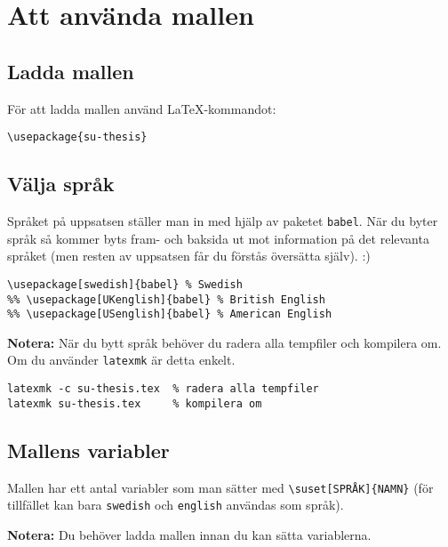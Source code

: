 
\section{Att använda mallen}
\label{mallen}


\subsection{Ladda mallen}
\label{ladda}

För att ladda mallen använd \LaTeX{}-kommandot:

\begin{verbatim}
\usepackage{su-thesis}
\end{verbatim}


\subsection{Välja språk}
\label{språk}

\noindent Språket på uppsatsen ställer man in med hjälp av paketet
\texttt{babel}. När du byter språk så kommer byts fram- och baksida ut mot
information på det relevanta språket (men resten av uppsatsen får du förstås
översätta själv). :)

\begin{verbatim}
\usepackage[swedish]{babel} % Swedish
%% \usepackage[UKenglish]{babel} % British English
%% \usepackage[USenglish]{babel} % American English
\end{verbatim}

\noindent\textbf{Notera:} När du bytt språk behöver du radera alla tempfiler
och kompilera om. Om du använder \texttt{latexmk} är detta enkelt.

\begin{verbatim}
latexmk -c su-thesis.tex  % radera alla tempfiler
latexmk su-thesis.tex     % kompilera om
\end{verbatim}


\subsection{Mallens variabler}
\label{variabler}

Mallen har ett antal variabler som man sätter med \verb|\suset[SPRÅK]{NAMN}|
(för tillfället kan bara \texttt{swedish} och \texttt{english} användas som
språk).

\textbf{Notera:} Du behöver ladda mallen innan du kan sätta variablerna.

